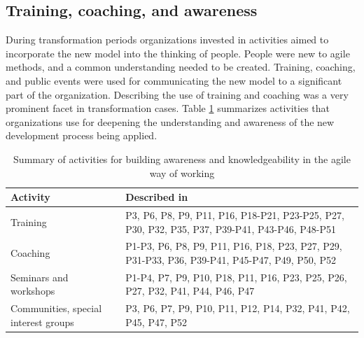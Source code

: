 \subsection{Training, coaching, and awareness}

During transformation periods organizations invested in activities aimed to
incorporate the new model into the thinking of people. People were new to agile
methods, and a common understanding needed to be created. Training, coaching,
and public events were used for communicating the new model to a significant
part of the organization. Describing the use of training and coaching was a very
prominent facet in transformation cases.
Table \ref{table:transformation_training} summarizes activities that
organizations use for deepening the understanding and awareness of the new
development process being applied.

\begin{table}[h]
    \centering
    \begin{tabular}{ >{\raggedright\arraybackslash}p{}
                     >{\raggedright\arraybackslash}p{} }
        \toprule
        Activity           &  Described in  \\
        \midrule
        Training    &
                P3, P6, P8, P9, P11, P16, P18-P21, P23-P25, P27, P30,
                P32, P35, P37, P39-P41, P43-P46, P48-P51  \\  %
        Coaching    &
                P1-P3, P6, P8, P9, P11, P16, P18, P23, P27, P29,
                P31-P33, P36, P39-P41, P45-P47, P49, P50, P52  \\  %
        Seminars and workshops   &
                P1-P4, P7, P9, P10, P18, P11, P16, P23, P25,
                P26, P27, P32, P41, P44, P46, P47   \\   %
        Communities, special interest groups  &
                P3, P6, P7, P9, P10, P11, P12, P14, P32, P41,
                P42, P45, P47, P52  \\   %
        \bottomrule
    \end{tabular}
    \caption{Summary of activities for building awareness and knowledgeability
             in the agile way of working}
    \label{table:transformation_training}
\end{table}



